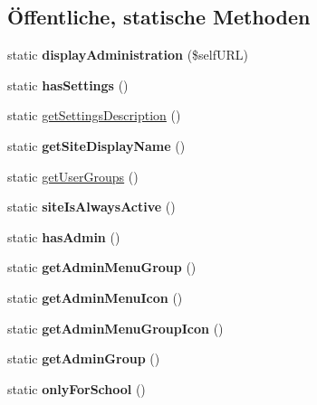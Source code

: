 \subsection*{Öffentliche, statische Methoden}
\begin{DoxyCompactItemize}
\item 
\mbox{\label{classkondolenzbuch_a07eb9039e6578022a0fff58e55c41549}} 
static {\bfseries display\+Administration} (\$self\+U\+RL)
\item 
\mbox{\label{classkondolenzbuch_ad5a622e35166ad91182aae64d4092dc5}} 
static {\bfseries has\+Settings} ()
\item 
static \mbox{\hyperlink{classkondolenzbuch_acd4a3ca52c2042b60155c2401d7bf813}{get\+Settings\+Description}} ()
\item 
\mbox{\label{classkondolenzbuch_a831d0e0326bd9da8a5f9b833acfefc6c}} 
static {\bfseries get\+Site\+Display\+Name} ()
\item 
static \mbox{\hyperlink{classkondolenzbuch_adcc8168234501a539980e4eb07c511e9}{get\+User\+Groups}} ()
\item 
\mbox{\label{classkondolenzbuch_a25b6e4fb5b14adde737d95e834929f04}} 
static {\bfseries site\+Is\+Always\+Active} ()
\item 
\mbox{\label{classkondolenzbuch_adca8062d7fdb19d1a7b42b9a8306ff04}} 
static {\bfseries has\+Admin} ()
\item 
\mbox{\label{classkondolenzbuch_a5ecbf3a6ad5fc8ef36965413761ac65b}} 
static {\bfseries get\+Admin\+Menu\+Group} ()
\item 
\mbox{\label{classkondolenzbuch_a56fb7392b767e09beff3c26feadb4220}} 
static {\bfseries get\+Admin\+Menu\+Icon} ()
\item 
\mbox{\label{classkondolenzbuch_aae38dc8d95827e518c2eda95be5a2527}} 
static {\bfseries get\+Admin\+Menu\+Group\+Icon} ()
\item 
\mbox{\label{classkondolenzbuch_a07470e65d43b511c9730446ba0fe9877}} 
static {\bfseries get\+Admin\+Group} ()
\item 
\mbox{\label{classkondolenzbuch_a10644599c60c2b90a52286e6b65ae39b}} 
static {\bfseries only\+For\+School} ()
\end{DoxyCompactItemize}
